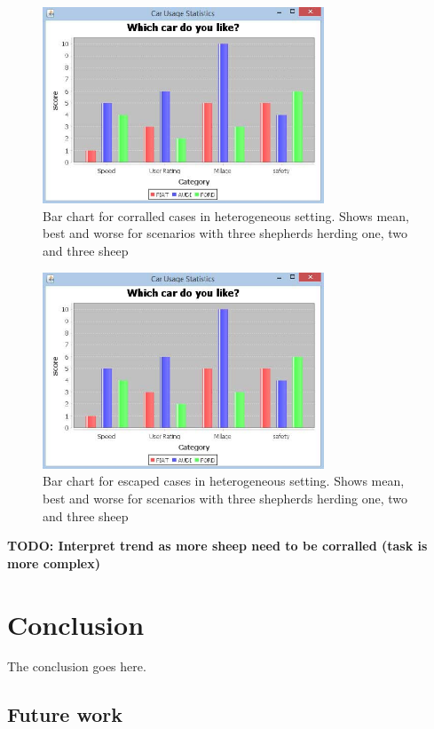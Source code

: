 \documentclass[conference]{IEEEtran}
\begin{document}
\begin{figure}[ht]
	\centering
	\includegraphics[width=3.3in]{imgs/barchart.jpg}
	\caption{Bar chart for corralled cases in heterogeneous setting. Shows mean, best and worse for scenarios with three shepherds herding one, two and three sheep}
	\label{fig:corralled_threeShepherd}
\end{figure}

\begin{figure}[ht]
	\centering
	\includegraphics[width=3.3in]{imgs/barchart.jpg}
	\caption{Bar chart for escaped cases in heterogeneous setting. Shows mean, best and worse for scenarios with three shepherds herding one, two and three sheep}
	\label{fig:escaped_threeShepherd}
\end{figure}

\textbf{TODO: Interpret trend as more sheep need to be corralled (task is more complex)}


\section{Conclusion}
The conclusion goes here.

\subsection{Future work}






\end{document}
